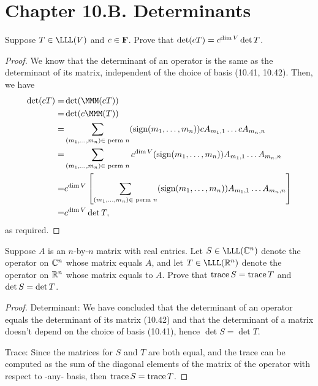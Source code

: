 \section*{Chapter 10.B. Determinants}


\begin{exercise}{4}
  Suppose $T\in\LLL(V)$ and $c\in\mathbf{F}$. Prove that $\operatorname*{det}(cT)=c^{\dim V}\operatorname*{det} T$.
\end{exercise}
\begin{proof}
 We know that the determinant of an operator is the same as the determinant of its matrix, independent of the choice of basis (10.41, 10.42). Then, we have
 \begin{align*}
     \det(cT) =& \det(\MMM(cT))\\
     =& \det(c\MMM(T))\\
     =& \sum_{(m_1,\dots,m_n)\in\text{ perm }n}(\text{sign}(m_1,\dots,m_n))cA_{m_1,1}\dots cA_{m_n,n}\\
     =& \sum_{(m_1,\dots,m_n)\in\text{ perm }n}c^{\dim V}(\text{sign}(m_1,\dots,m_n))A_{m_1,1}\dots A_{m_n,n}\\
     =& c^{\dim V}\left[\sum_{(m_1,\dots,m_n)\in\text{ perm }n}(\text{sign}(m_1,\dots,m_n))A_{m_1,1}\dots A_{m_n,n}\right]\\
     =& c^{\dim V}\det T,
 \end{align*}
 as required.
\end{proof}

\begin{exercise}{7}
  Suppose $A$ is an $n$-by-$n$ matrix with real entries. Let $S\in\LLL(\C^n)$ denote the operator on $\mathbb{C}^n$ whose matrix equals $A$, and let $T\in\LLL(\R^n)$ denote the operator on $\mathbb{R}^n$ whose matrix equals to $A$. Prove that $\operatorname*{trace} S=\operatorname*{trace} T$ and $\operatorname*{det} S=\operatorname*{det} T$.
\end{exercise}
\begin{proof}
 Determinant: We have concluded that the determinant of an operator equals the determinant of its matrix (10.42) and that the determinant of a matrix doesn't depend on the choice of basis (10.41), hence $\det S=\det T$.

 Trace: Since the matrices for $S$ and $T$ are both equal, and the trace can be computed as the sum of the diagonal elements of the matrix of the operator with respect to -any- basis, then $\operatorname*{trace} S=\operatorname*{trace} T$.
\end{proof}

